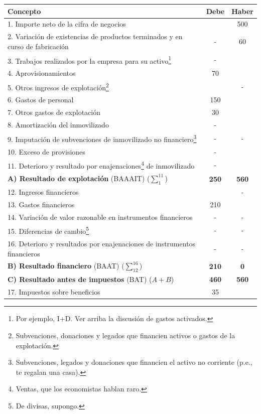\documentclass[nochap,palatino,shortheader]{apuntes}
\begin{document}
\begin{table}[hbtp]
\centering
\begin{minipage}{\textwidth}
\footnotesize
\begin{tabular}{l|c|c}
\textbf{Concepto} & \textbf{Debe} & \textbf{Haber} \\ \toprule
1. Importe neto de la cifra de negocios & & 500 \\
2. Variación de existencias de productos terminados y en curso de fabricación & - & 60 \\
3. Trabajos realizados por la empresa para su activo\footnote{Por ejemplo, I+D. Ver arriba la discusión de gastos activados.} & - & \\
4. Aprovisionamientos & 70 &  \\
5. Otros ingresos de explotación\footnote{Subvenciones, donaciones y legados que financien activos o gastos de la explotación.} & & - \\
6. Gastos de personal & 150 & \\
7. Otros gastos de explotación & 30 & \\
8. Amortización del inmovilizado & - & \\
9. Imputación de subvenciones de inmovilizado no financiero\footnote{Subvenciones, legados y donaciones que financien el activo no corriente (p.e., te regalan una casa).} & - & - \\
10. Exceso de provisiones & - & \\
11. Deterioro y resultado por enajenaciones\footnote{Ventas, que los economistas hablan raro.} de inmovilizado & - & \\ \midrule
\textbf{A) Resultado de explotación} (BAAAIT) ($\sum_1^{11}$) & \textbf{250} & \textbf{560} \\ \midrule
12. Ingresos financieros & & - \\
13. Gastos financieros & 210 & \\
14. Variación de valor razonable en instrumentos financieros & - & - \\
15. Diferencias de cambio\footnote{De divisas, supongo.} & - & - \\
16. Deterioro y resultados por enajenaciones de instrumentos financieros & - & - \\ \midrule
\textbf{B) Resultado financiero} (BAAT) ($\sum_{12}^{16}$) & \textbf{210} & \textbf{0} \\ \midrule
\textbf{C) Resultado antes de impuestos} (BAT) ($A + B$) & \textbf{460} & \textbf{560} \\ \midrule
17. Impuestos sobre beneficios & 35 & \\ \midrule

\end{tabular}
\end{minipage}
\end{table}
\end{document}
